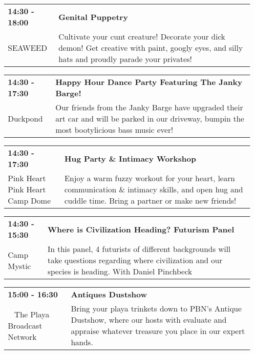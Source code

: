 \begin{tabular}{ p{1in} p{2.2in} }
    \textbf{14:30 - 18:00} & \textbf{Genital Puppetry} \\
    SEAWEED \newline  & Cultivate your cunt creature! Decorate your dick demon! Get creative with paint, googly eyes, and silly hats and proudly parade your privates! \\
    \hline 
\end{tabular}
    
\begin{tabular}{ p{1in} p{2.2in} }
    \textbf{14:30 - 17:30} & \textbf{Happy Hour Dance Party Featuring The Janky Barge!} \\
    Duckpond \newline  & Our friends from the Janky Barge have upgraded their art car and will be parked in our driveway, bumpin the most bootylicious bass music ever! \\
    \hline 
\end{tabular}
    
\begin{tabular}{ p{1in} p{2.2in} }
    \textbf{14:30 - 17:30} & \textbf{Hug Party \& Intimacy Workshop} \\
    Pink Heart \newline Pink Heart Camp Dome & Enjoy a warm fuzzy workout for your heart, learn communication \& intimacy skills, and open hug and cuddle time. Bring a partner or make new friends! \\
    \hline 
\end{tabular}
    
\begin{tabular}{ p{1in} p{2.2in} }
    \textbf{14:30 - 15:30} & \textbf{Where is Civilization Heading? Futurism Panel} \\
    Camp Mystic \newline  & In this panel, 4 futurists of different backgrounds will take questions regarding where civilization and our species is heading. With Daniel Pinchbeck \\
    \hline 
\end{tabular}
    
\begin{tabular}{ p{1in} p{2.2in} }
    \textbf{15:00 - 16:30} & \textbf{Antiques Dustshow} \\
    ~ \newline The Playa Broadcast Network & Bring your playa trinkets down to PBN's Antique Dustshow, where our hosts with evaluate and appraise whatever treasure you place in our expert hands. \\
    \hline 
\end{tabular}
    
